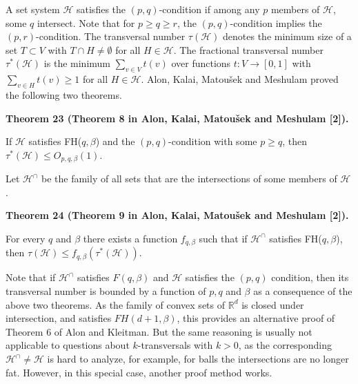 \par
\par
A set system $\mathcal{H}$ satisfies the $(p,q)$-condition if among any $p$ members of $\mathcal{H}$, some $q$ intersect. Note that for $p\geq q\geq r$, the $(p,q)$-condition implies the $(p,r)$-condition. The transversal number $\tau(\mathcal{H})$ denotes the minimum size of a set $T\subset V$ with $T\cap H\neq\emptyset$ for all $H\in\mathcal{H}$. The fractional transversal number $\tau^{*}(\mathcal{H})$ is the minimum $\sum_{v\in V}t(v)$ over functions $t\colon V\to[0,1]$ with $\sum_{v\in H}t(v)\geq 1$ for all $H\in\mathcal{H}$. Alon, Kalai, Matoušek and Meshulam proved the following two theorems.
\par
\par
\par\medskip\noindent\textbf{Theorem 23 (Theorem 8 in Alon, Kalai, Matoušek and Meshulam [2]).}\par
If $\mathcal{H}$ satisfies FH($q,\beta$) and the $(p,q)$-condition with some $p\geq q$, then $\tau^{*}(\mathcal{H})\leq O_{p,q,\beta}(1)$.
\par
\par
\par
Let $\mathcal{H}^{\cap}$ be the family of all sets that are the intersections of some members of $\mathcal{H}$.
\par
\par
\par\medskip\noindent\textbf{Theorem 24 (Theorem 9 in Alon, Kalai, Matoušek and Meshulam [2]).}\par
For every $q$ and $\beta$ there exists a function $f_{q,\beta}$ such that if $\mathcal{H}^{\cap}$ satisfies FH($q,\beta$), then $\tau(\mathcal{H})\leq f_{q,\beta}(\tau^{*}(\mathcal{H}))$.
\par
\par
\par
Note that if $\mathcal{H}^{\cap}$ satisfies $F(q,\beta)$ and $\mathcal{H}$ satisfies the $(p,q)$ condition, then its transversal number is bounded by a function of $p,q$ and $\beta$ as a consequence of the above two theorems. As the family of convex sets of $\mathbb{R}^{d}$ is closed under intersection, and satisfies $FH(d+1,\beta)$, this provides an alternative proof of Theorem 6 of Alon and Kleitman. But the same reasoning is usually not applicable to questions about $k$-transversals with $k>0$, as the corresponding $\mathcal{H}^{\cap}\neq\mathcal{H}$ is hard to analyze, for example, for balls the intersections are no longer fat. However, in this special case, another proof method works.
